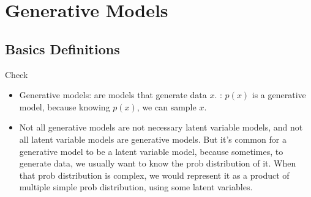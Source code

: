 \chapter{Generative Models}

\section{Basics Definitions}
Check 
\begin{itemize}
	\item Generative models: are models that generate data $x$. \Eg: $p(x)$ is a generative model, because knowing $p(x)$, we can sample $x$.
\end{itemize}

\note
\begin{itemize}
	\item Not all generative models are not necessary latent variable models, and not all latent variable models are generative models. But it's common for a generative model to be a latent variable model, because sometimes, to generate data, we usually want to know the \ac{prob} distribution of it. When that \ac{prob} distribution is complex, we would represent it as a product of multiple simple \ac{prob} distribution, using some latent variables.
\end{itemize}
